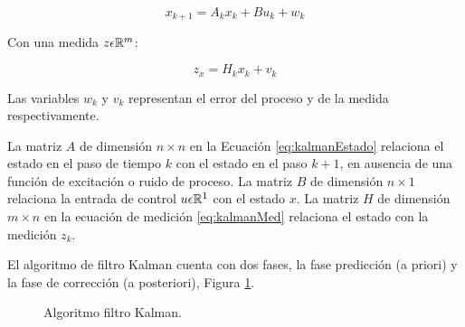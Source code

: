\begin{equation}
\label{eq:kalmanEstado}
    x_{k+1} = A_kx_k + Bu_k + w_k
\end{equation}

Con una medida $z \space \epsilon \space \mathbb{R}^{m}$:

\begin{equation}
\label{eq:kalmanMed}
    z_x = H_kx_k + v_k
\end{equation}

Las variables $w_k$ y $v_k$ representan el error del proceso y de la medida respectivamente.

La matriz $A$  de dimensión $n\times{}n$ en la Ecuación \eqref{eq:kalmanEstado} relaciona el estado en el paso de tiempo $k$ con el estado en el paso $k + 1$, en ausencia de una función de excitación o ruido de proceso. La matriz $B$ de dimensión $n\times{}1$ relaciona la entrada de control $u \space \epsilon \mathbb{R}^{1}$ con el estado $x$. La matriz $H$ de dimensión $m\times{}n$ en la ecuación de medición \eqref{eq:kalmanMed} relaciona el estado con la medición $z_k$.

El algoritmo de filtro Kalman cuenta con dos fases, la fase predicción (a priori) y la fase de corrección (a posteriori), Figura \ref{fig:AlgoritmoFiltroKalman}.

\begin{figure}[H]
    \centering
    \caption{Algoritmo filtro Kalman.}
    \label{fig:AlgoritmoFiltroKalman}
\end{figure}

